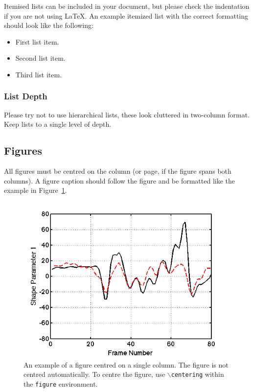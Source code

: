 \documentclass{cmppgr}
\begin{document}
Itemised lists can be included in your document, but please check the indentation if you are not using \LaTeX. An example itemized list with the correct formatting should look like the following:
%
\begin{itemize}
\item{First list item.}
\item{Second list item.}
\item{Third list item.}
\end{itemize}
%

\subsubsection{List Depth}

Please try not to use hierarchical lists, these look cluttered in two-column format. Keep lists to a single level of depth.

\subsection{Figures}

All figures must be centred on the column (or page, if the figure spans both columns). A figure caption should follow the figure and be formatted like the example in Figure~\ref{fig:columnfigure}.

\begin{figure}[h]
\centering
\includegraphics[scale=0.4]{sparam_1_errors}
\caption{An example of a figure centred on a single column. The figure is not centred automatically. To centre the figure, use \texttt{$\backslash$centering} within the \texttt{figure} environment.}
\label{fig:columnfigure}
\end{figure}
\end{document}
